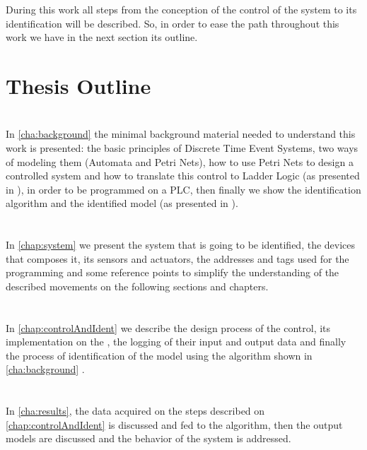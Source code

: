During this work all steps from the conception of the control of the system to
its identification will be described. So, in order to ease the path throughout
this work we have in the next section its outline.

\section{Thesis Outline}
\label{sec:thesisOutline}

\paragraph{} ~\\
In \autoref{cha:background} the minimal background material needed to understand
this work is presented: the basic principles of Discrete Time Event Systems, two
ways of modeling them (Automata and Petri Nets), how to use Petri Nets to design
a controlled system and how to translate this control to Ladder Logic (as
presented in \cite{moreira2013bridging}), in order to be programmed on a PLC,
then finally we show the identification algorithm and the identified model
\DAOCT (as presented in \cite{moreira2018enhanced}).

\paragraph{} ~\\
In \autoref{chap:system} we present the system that is going to be identified,
the devices that composes it, its sensors and actuators, the addresses and tags
used for the programming and some reference points to simplify the understanding
of the described movements on the following sections and chapters.


\paragraph{} ~\\
In \autoref{chap:controlAndIdent} we describe the design process of the control,
its implementation on the \PLCs, the logging of their input and output data and
finally the process of identification of the model using the algorithm shown in
\autoref{cha:background} .

\paragraph{} ~\\
In \autoref{cha:results}, the data acquired on the steps described on
\autoref{chap:controlAndIdent} is discussed and fed to the algorithm, then the
output models are discussed and the behavior of the system is addressed.


